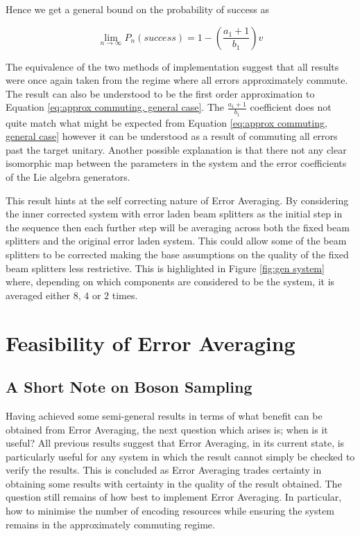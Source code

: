 \documentclass[aps,pra,twocolumn,superscriptaddress,numerical]{revtex4-1}
\begin{document}
		Hence we get a general bound on the probability of success as
			
		\begin{equation}
			\lim_{n\rightarrow\infty}P_{n}\left(success\right)=1-\left(\frac{a_{1}+1}{b_{1}}\right)v\label{eq:PsuccessGeneral}
		\end{equation}	
			
		The equivalence of the two methods of implementation suggest that all results were once again taken from the regime where all errors approximately commute. The result can also be understood to be the first order approximation to Equation \ref{eq:approx commuting, general case}. The $\frac{a_1+1}{b_1}$ coefficient does not quite match what might be expected from Equation \ref{eq:approx commuting, general case} however it can be understood as a result of commuting all errors past the target unitary. Another possible explanation is that there not any clear isomorphic map between the parameters in the system and the error coefficients of the Lie algebra generators.
			
		This result hints at the self correcting nature of Error Averaging. By considering the inner corrected system with error laden beam splitters as the initial step in the sequence then each further step will be averaging across both the fixed beam splitters and the original error laden system. This could allow some of the beam splitters to be corrected  making the base assumptions on the quality of the fixed beam splitters less restrictive. This is highlighted in Figure \ref{fig:gen system} where, depending on which components are considered to be the system, it is averaged either $8$, $4$ or $2$ times. 

\section{Feasibility of Error Averaging\label{Feasibility section}}

	\subsection{A Short Note on Boson Sampling\label{Boson Sampling}}

		Having achieved some semi-general results in terms of what benefit can be obtained from Error Averaging, the next question which arises is; when is it useful? All previous results suggest that Error Averaging, in its current state, is particularly useful for any system in which the result cannot simply be checked to verify the results. This is concluded as Error Averaging trades certainty in obtaining some results with certainty in the quality of the result obtained. The question still remains of how best to implement Error Averaging. In particular, how to minimise the number of encoding resources while ensuring the system remains in the approximately commuting regime.
		
\end{document}
